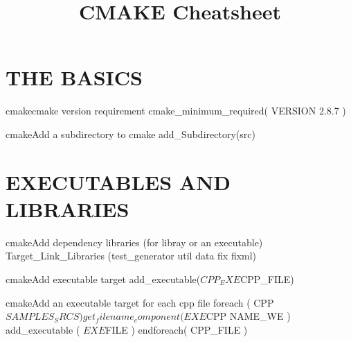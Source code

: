 \documentclass[10pt,a4paper]{article}
\title{\color{w3schools}CMAKE Cheatsheet
}
\begin{document}
\maketitle

\small
\begin{multicols}{3}

\thispagestyle{empty}
\scriptsize



{\centering\section{THE BASICS}}

\begin{codebox}{cmake}{cmake version requirement}
cmake_minimum_required( VERSION 2.8.7 )

\end{codebox}

\begin{codebox}{cmake}{Add a subdirectory to cmake}
add_Subdirectory(src)

\end{codebox}

{\centering\section{EXECUTABLES AND LIBRARIES}}


\begin{codebox}{cmake}{Add dependency libraries (for libray or an executable)}
Target_Link_Libraries (test_generator
	util data fix fixml)

\end{codebox}

\begin{codebox}{cmake}{Add executable target}
add_executable(${CPP_EXE} ${CPP_FILE})

\end{codebox}

\begin{codebox}{cmake}{Add an executable target for each cpp file}
foreach ( CPP ${SAMPLES_SRCS} ) 
   get_filename_component(EXE ${CPP} NAME_WE ) 
   add_executable ( ${EXE} ${FILE} )
endforeach( CPP_FILE )

\end{codebox}


\end{multicols}
\end{document}

